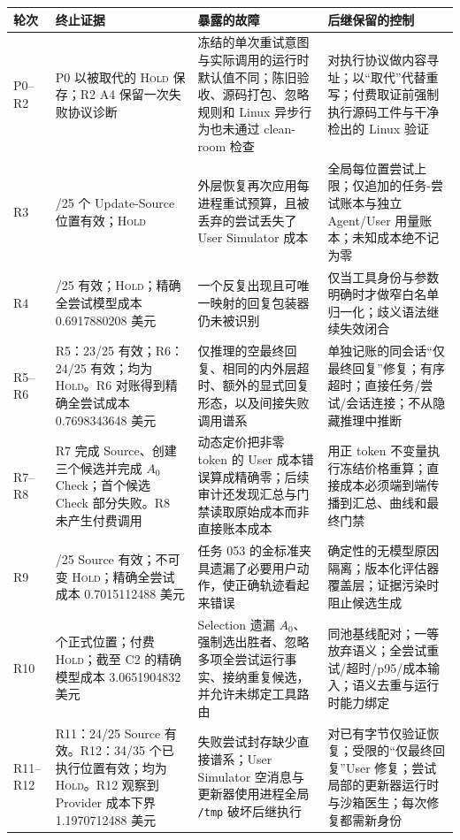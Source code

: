 \documentclass[UTF8,10pt,twocolumn,fontset=none]{ctexart}
\newcommand{\hold}{\textsc{Hold}\xspace}
\newcommand{\code}[1]{\texttt{#1}}
\begin{document}
\begin{table}[!t]
\centering
\scriptsize
\setlength{\tabcolsep}{3.2pt}
\renewcommand{\arraystretch}{1.17}
\begin{tabular}{
  >{\raggedright\arraybackslash}p{}
  >{\raggedright\arraybackslash}p{}
  >{\raggedright\arraybackslash}p{}
  >{\raggedright\arraybackslash}p{}
}
\toprule
轮次 & 终止证据 & 暴露的故障 & 后继保留的控制 \\
\midrule
P0--R2 & P0 以被取代的 \hold 保存；R2 A4 保留一次失败协议诊断 & 冻结的单次重试意图与实际调用的运行时默认值不同；陈旧验收、源码打包、忽略规则和 Linux 异步行为也未通过 clean-room 检查 & 对执行协议做内容寻址；以“取代”代替重写；付费取证前强制执行源码工件与干净检出的 Linux 验证 \\
R3 & 22/25 个 Update-Source 位置有效；\hold & 外层恢复再次应用每进程重试预算，且被丢弃的尝试丢失了 User Simulator 成本 & 全局每位置尝试上限；仅追加的任务-尝试账本与独立 Agent/User 用量账本；未知成本绝不记为零 \\
R4 & 24/25 有效；\hold；精确全尝试模型成本 0.6917880208 美元 & 一个反复出现且可唯一映射的回复包装器仍未被识别 & 仅当工具身份与参数明确时才做窄白名单归一化；歧义语法继续失效闭合 \\
R5--R6 & R5：23/25 有效；R6：24/25 有效；均为 \hold。R6 对账得到精确全尝试成本 0.7698343648 美元 & 仅推理的空最终回复、相同的内外层超时、额外的显式回复形态，以及间接失败调用谱系 & 单独记账的同会话“仅最终回复”修复；有序超时；直接任务/尝试/会话连接；不从隐藏推理中推断 \\
R7--R8 & R7 完成 Source、创建三个候选并完成 $A_0$ Check；首个候选 Check 部分失败。R8 未产生付费调用 & 动态定价把非零 token 的 User 成本错误算成精确零；后续审计还发现汇总与门禁读取原始成本而非直接账本成本 & 用正 token 不变量执行冻结价格重算；直接成本必须端到端传播到汇总、曲线和最终门禁 \\
R9 & 25/25 Source 有效；不可变 \hold；精确全尝试成本 0.7015112488 美元 & 任务 053 的金标准夹具遗漏了必要用户动作，使正确轨迹看起来错误 & 确定性的无模型原因隔离；版本化评估器覆盖层；证据污染时阻止候选生成 \\
R10 & 95 个正式位置；付费 \hold；截至 C2 的精确模型成本 3.0651904832 美元 & Selection 遗漏 $A_0$、强制选出胜者、忽略多项全尝试运行事实、接纳重复候选，并允许未绑定工具路由 & 同池基线配对；一等放弃语义；全尝试重试/超时/p95/成本输入；语义去重与运行时能力绑定 \\
R11--R12 & R11：24/25 Source 有效。R12：34/35 个已执行位置有效；均为 \hold。R12 观察到 Provider 成本下界 1.1970712488 美元 & 失败尝试封存缺少直接谱系；User Simulator 空消息与更新器使用进程全局 \code{/tmp} 破坏后继执行 & 对已有字节仅验证恢复；受限的“仅最终回复”User 修复；尝试局部的更新器运行时与沙箱医生；每次修复都需新身份 \\

\end{tabular}
\end{table}
\end{document}
